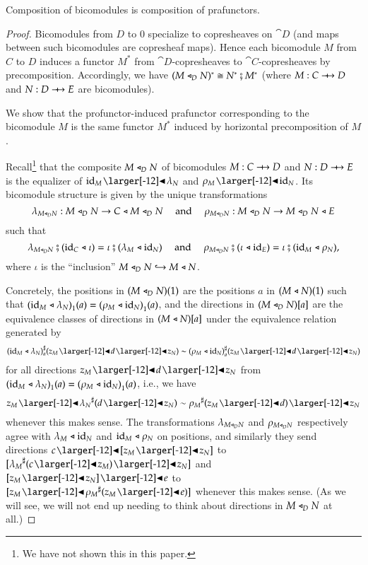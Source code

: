 \documentclass{amsart}
\begin{document}
\begin{prop}
  Composition of bicomodules is composition of prafunctors.
\end{prop}
\begin{proof}
  Bicomodules from $D$ to $0$ specialize to copresheaves on $\cat{D}$
  (and maps between such bicomodules are copresheaf maps). Hence each
  bicomodule $M$ from $C$ to $D$ induces a functor $M^*$ from
  $\cat{D}$-copresheaves to $\cat{C}$-copresheaves by
  precomposition. Accordingly, we have
  $(M \mathrel{\triangleleft}_D N)^* \cong N^* \fatsemi M^*$ (where $M: C \bim D$ and
  $N: D \bim E$ are bicomodules).
  
  We show that the profunctor-induced prafunctor corresponding to the
  bicomodule $M$ is the same functor $M^*$ induced by horizontal
  precomposition of $M$.

  Recall\footnote{We have not shown this in this paper.} that the
  composite $M \mathrel{\triangleleft}_D N$ of bicomodules ${M: C \bim D}$ and
  ${N: D \bim E}$ is the equalizer of $\id_M \subd \lambda_N$ and
  $\rho_M \subd \id_N$. Its bicomodule structure is given by the
  unique transformations
  \[\lambda_{M \mathrel{\triangleleft}_D N}: M \mathrel{\triangleleft}_D N \to C \mathrel{\triangleleft} M \mathrel{\triangleleft}_D N \quad
    \text{ and } \quad \rho_{M \mathrel{\triangleleft}_D N} : M \mathrel{\triangleleft}_D N \to M \mathrel{\triangleleft}_D N
    \mathrel{\triangleleft} E\] such that
  \[\lambda_{M \mathrel{\triangleleft}_D N} \fatsemi (\mathrm{id}_C \mathrel{\triangleleft} \iota) = \iota \fatsemi
  (\lambda_M \mathrel{\triangleleft} \mathrm{id}_N) \quad \text{ and } \quad
  \rho_{M \mathrel{\triangleleft}_D N} \fatsemi (\iota \mathrel{\triangleleft} \mathrm{id}_E) = \iota \fatsemi
  (\mathrm{id}_M \mathrel{\triangleleft} \rho_N),\] where $\iota$ is the ``inclusion''
  $M \mathrel{\triangleleft}_D N \hookrightarrow M \mathrel{\triangleleft} N$.

  Concretely, the positions in $(M \mathrel{\triangleleft}_D N)(1)$ are the positions
  $a$ in $(M \mathrel{\triangleleft} N)(1)$ such that
  ${(\mathrm{id}_M \mathrel{\triangleleft} \lambda_N)}_1(a) = {(\rho_M \mathrel{\triangleleft}
    \mathrm{id}_N)}_1(a)$, and the directions in $(M \mathrel{\triangleleft}_D N)[a]$ are the
  equivalence classes of directions in $(M \mathrel{\triangleleft} N)[a]$ under the
  equivalence relation generated by
  \[\dirmapof{(\id_M \sub \lambda_N)}{a}{z_M \subd d \subd z_N} \sim \dirmapof{(\rho_M \sub
      \id_N)}{a}{z_M \subd d \subd z_N}\] for all directions
  $z_M \subd d \subd z_N$ from
  ${(\mathrm{id}_M \mathrel{\triangleleft} \lambda_N)}_1(a) = {(\rho_M \mathrel{\triangleleft}
    \mathrm{id}_N)}_1(a)$, i.e., we have
  \[z_M \subd \anydirmapof{\lambda_N}{d \subd z_N} \sim
    \anydirmapof{\rho_M}{z_M \subd d} \subd z_N\] whenever this makes
  sense. The transformations $\lambda_{M \mathrel{\triangleleft}_D N}$ and
  $\rho_{M \mathrel{\triangleleft}_D N}$ respectively agree with $\lambda_M \mathrel{\triangleleft} \mathrm{id}_N$
  and $\mathrm{id}_M \mathrel{\triangleleft} \rho_N$ on positions, and similarly they send
  directions $c \subd [z_M \subd z_N]$ to
  $[\anydirmapof{\lambda_M}{c \subd z_M} \subd z_N]$ and
  $[z_M \subd z_N] \subd e$ to
  $[z_M \subd \anydirmapof{\rho_M}{z_M \subd e}]$ whenever this makes
  sense. (As we will see, we will not end up needing to think about
  directions in $M \mathrel{\triangleleft}_D N$ at all.)


\end{proof}
\end{document}
